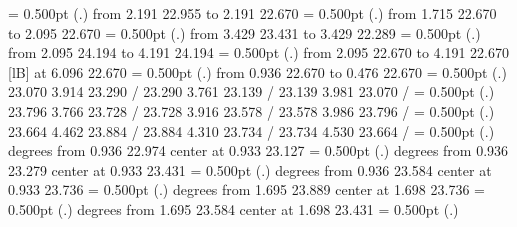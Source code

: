 {{}%
%
%
\linethickness= 0.500pt
\setplotsymbol ({\thinlinefont .})
{\color[rgb]{0,0,0}\putrule from  2.191 22.955 to  2.191 22.670
}%
%
%
\linethickness= 0.500pt
\setplotsymbol ({\thinlinefont .})
{\color[rgb]{0,0,0}\putrule from  1.715 22.670 to  2.095 22.670
}%
%
%
\linethickness= 0.500pt
\setplotsymbol ({\thinlinefont .})
{\color[rgb]{0,0,0}\putrule from  3.429 23.431 to  3.429 22.289
}%
%
%
\linethickness= 0.500pt
\setplotsymbol ({\thinlinefont .})
{\color[rgb]{0,0,0}\putrule from  2.095 24.194 to  4.191 24.194
}%
%
%
\linethickness= 0.500pt
\setplotsymbol ({\thinlinefont .})
{\color[rgb]{0,0,0}\putrule from  2.095 22.670 to  4.191 22.670
}%
%
%
 [lB] at  6.096 22.670
%
%
\linethickness= 0.500pt
\setplotsymbol ({\thinlinefont .})
{\color[rgb]{0,0,0}\putrule from  0.936 22.670 to  0.476 22.670
}%
%
%
\linethickness= 0.500pt
\setplotsymbol ({\thinlinefont .})
{\color[rgb]{0,0,0} 23.070  3.914 23.290 /
 23.290  3.761 23.139 /
 23.139  3.981 23.070 /
}%
%
%
\linethickness= 0.500pt
\setplotsymbol ({\thinlinefont .})
{\color[rgb]{0,0,0} 23.796  3.766 23.728 /
 23.728  3.916 23.578 /
 23.578  3.986 23.796 /
}%
%
%
\linethickness= 0.500pt
\setplotsymbol ({\thinlinefont .})
{\color[rgb]{0,0,0} 23.664  4.462 23.884 /
 23.884  4.310 23.734 /
 23.734  4.530 23.664 /
}%
%
%
\linethickness= 0.500pt
\setplotsymbol ({\thinlinefont .})
{\color[rgb]{0,0,0} degrees from  0.936 22.974 center at  0.933 23.127
}%
%
%
\linethickness= 0.500pt
\setplotsymbol ({\thinlinefont .})
{\color[rgb]{0,0,0} degrees from  0.936 23.279 center at  0.933 23.431
}%
%
%
\linethickness= 0.500pt
\setplotsymbol ({\thinlinefont .})
{\color[rgb]{0,0,0} degrees from  0.936 23.584 center at  0.933 23.736
}%
%
%
\linethickness= 0.500pt
\setplotsymbol ({\thinlinefont .})
{\color[rgb]{0,0,0} degrees from  1.695 23.889 center at  1.698 23.736
}%
%
%
\linethickness= 0.500pt
\setplotsymbol ({\thinlinefont .})
{\color[rgb]{0,0,0} degrees from  1.695 23.584 center at  1.698 23.431
}%
%
%
\linethickness= 0.500pt
\setplotsymbol ({\thinlinefont .})
}
